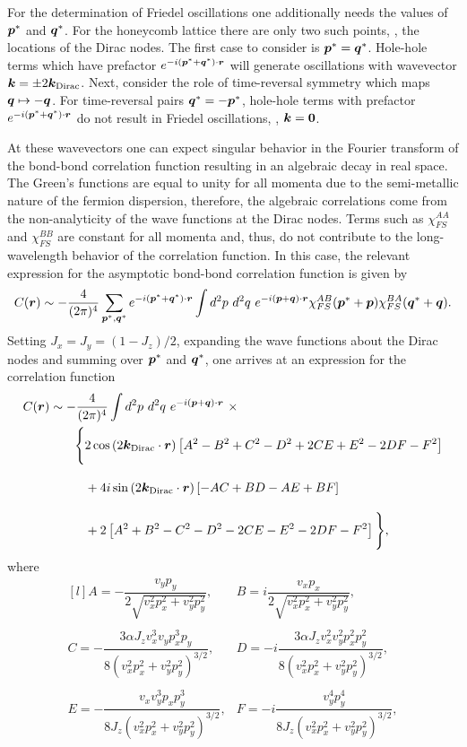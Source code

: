 For the determination of Friedel oscillations one additionally needs the values of $\bm{p}^*$ and $\bm{q}^*$.
For the honeycomb lattice there are only two such points, \ie, the locations of the Dirac nodes.
The first case to consider is $\bm{p}^* = \bm{q}^*$.
Hole-hole terms which have prefactor $e^{-i(\bm{p}^* + \bm{q}^*)\cdot\bm{r}}$ will generate oscillations with wavevector $\bm{k} = \pm 2\bm{k}_{\rm Dirac}$.
Next, consider the role of time-reversal symmetry which maps $\bm{q} \mapsto -\bm{q}$.
For time-reversal pairs $\bm{q}^* = -\bm{p}^*$, hole-hole terms with prefactor $e^{-i(\bm{p}^* + \bm{q}^*)\cdot\bm{r}}$ do not result in Friedel oscillations, \ie, $\bm{k} = \bm{0}$.

At these wavevectors one can expect singular behavior in the Fourier transform of the bond-bond correlation function resulting in an algebraic decay in real space.
The Green's functions are equal to unity for all momenta due to the semi-metallic nature of the fermion dispersion, therefore, the algebraic correlations come from the non-analyticity of the wave functions at the Dirac nodes.
Terms such as $\chi_{FS}^{AA}$ and $\chi_{FS}^{BB}$ are constant for all momenta and, thus, do not contribute to the long-wavelength behavior of the correlation function.
In this case, the relevant expression for the asymptotic bond-bond correlation function is given by
%
\begin{equation}
	C(\bm{r}) \sim -\frac{4}{(2\pi)^4} \sum_{\bm{p}^*, \bm{q}^*} e^{-i(\bm{p}^* + \bm{q}^*)\cdot\bm{r}} \int d^2p~d^2q~ e^{-i(\bm{p} + \bm{q})\cdot\bm{r}} \chi_{FS}^{AB}(\bm{p}^* + \bm{p}) \chi_{FS}^{BA}(\bm{q}^* + \bm{q}).
\end{equation}
%
Setting $J_x = J_y = (1 - J_z)/2$, expanding the wave functions about the Dirac nodes and summing over $\bm{p}^*$ and $\bm{q}^*$, one arrives at an expression for the correlation function
%
\begin{align}
	C(\br) &\sim -\frac{4}{(2\pi)^4} \int d^2p~d^2q~ e^{-i(\bp + \bq)\cdot\br}~\times \nonumber\\
	&\qquad\Bigg\{ 2\cos{(2\bk_{\rm Dirac}\cdot\br)}\left[A^2 - B^2 + C^2 - D^2 + 2CE + E^2 - 2DF - F^2\right] \nonumber\\
	&\qquad\phantom{\Bigg\{}+ 4i\sin{(2\bk_{\rm Dirac}\cdot\br)}\left[-AC + BD - AE + BF\right] \nonumber\\
	&\qquad\phantom{\Bigg\{}+ 2\left[A^2 + B^2 - C^2 - D^2 - 2CE - E^2 - 2DF - F^2\right]\Bigg\},
\end{align}
%
where
%
\begin{equation}
	\begin{matrix*}[l]
		A = -\dfrac{v_y p_y}{2\sqrt{v_x^2 p_x^2 + v_y^2 p_y^2}}, &
		B = i\dfrac{v_x p_x}{2\sqrt{v_x^2 p_x^2 + v_y^2 p_y^2}}, \\
		&\\
		C = -\dfrac{3 \alpha J_z v_x^3 v_y p_x^3 p_y}{8(v_x^2 p_x^2 + v_y^2 p_y^2)^{3/2}}, &
		D = -i\dfrac{3 \alpha J_z v_x^2 v_y^2 p_x^2 p_y^2}{8(v_x^2 p_x^2 + v_y^2 p_y^2)^{3/2}}, \\
		&\\
		E = -\dfrac{v_x v_y^3 p_x p_y^3}{8 J_z (v_x^2 p_x^2 + v_y^2 p_y^2)^{3/2}}, &
		F = -i\dfrac{v_y^4 p_y^4}{8 J_z (v_x^2 p_x^2 + v_y^2 p_y^2)^{3/2}},
	\end{matrix*}
\end{equation}
